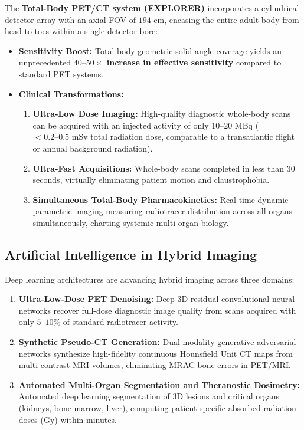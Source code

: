 \documentclass[11pt,a4paper]{article}
\begin{document}
The \textbf{Total-Body PET/CT system (EXPLORER)} incorporates a cylindrical detector array with an axial FOV of \textbf{$194\text{ cm}$}, encasing the entire adult body from head to toes within a single detector bore:
\begin{itemize}[leftmargin=2em]
    \item \textbf{Sensitivity Boost:} Total-body geometric solid angle coverage yields an unprecedented \textbf{$40\text{--}50\times$ increase in effective sensitivity} compared to standard PET systems.
    \item \textbf{Clinical Transformations:}
    \begin{enumerate}
        \item \textbf{Ultra-Low Dose Imaging:} High-quality diagnostic whole-body scans can be acquired with an injected activity of only $10\text{--}20\text{ MBq}$ ($< 0.2\text{--}0.5\text{ mSv}$ total radiation dose, comparable to a transatlantic flight or annual background radiation).
        \item \textbf{Ultra-Fast Acquisitions:} Whole-body scans completed in less than 30 seconds, virtually eliminating patient motion and claustrophobia.
        \item \textbf{Simultaneous Total-Body Pharmacokinetics:} Real-time dynamic parametric imaging measuring radiotracer distribution across all organs simultaneously, charting systemic multi-organ biology.
    \end{enumerate}
\end{itemize}

\subsection{Artificial Intelligence in Hybrid Imaging}
Deep learning architectures are advancing hybrid imaging across three domains:
\begin{enumerate}
    \item \textbf{Ultra-Low-Dose PET Denoising:} Deep 3D residual convolutional neural networks recover full-dose diagnostic image quality from scans acquired with only $5\text{--}10\%$ of standard radiotracer activity.
    \item \textbf{Synthetic Pseudo-CT Generation:} Dual-modality generative adversarial networks synthesize high-fidelity continuous Hounsfield Unit CT maps from multi-contrast MRI volumes, eliminating MRAC bone errors in PET/MRI.
    \item \textbf{Automated Multi-Organ Segmentation and Theranostic Dosimetry:} Automated deep learning segmentation of 3D lesions and critical organs (kidneys, bone marrow, liver), computing patient-specific absorbed radiation doses ($\text{Gy}$) within minutes.
\end{enumerate}
\end{document}
